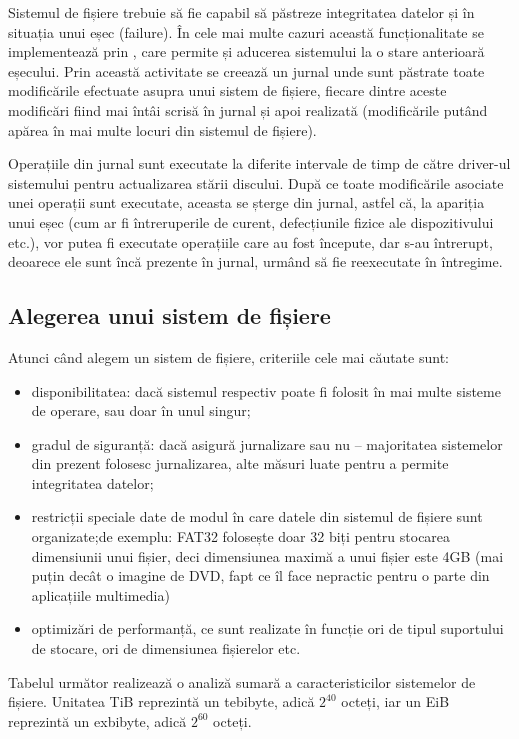 Sistemul de fișiere trebuie să fie capabil să păstreze integritatea datelor și
în situația unui eșec (failure). În cele mai multe cazuri această
funcționalitate se implementează prin , care permite și
aducerea sistemului la o stare anterioară eșecului. Prin această activitate se
creează un jurnal unde sunt păstrate toate modificările efectuate asupra unui
sistem de fișiere, fiecare dintre aceste modificări fiind mai întâi scrisă în
jurnal și apoi realizată (modificările putând apărea în mai multe locuri din
sistemul de fișiere).

Operațiile din jurnal sunt executate la diferite intervale de timp de către
driver-ul sistemului pentru actualizarea stării discului. După ce toate
modificările asociate unei operații sunt executate, aceasta se șterge din
jurnal, astfel că, la apariția unui eșec (cum ar fi întreruperile de curent,
defecțiunile fizice ale dispozitivului etc.), vor  putea fi executate operațiile
care au fost începute, dar s-au întrerupt, deoarece ele sunt încă prezente în
jurnal, urmând să fie reexecutate în întregime.

\subsection{Alegerea unui sistem de fișiere}

Atunci când alegem un sistem de fișiere, criteriile cele mai căutate sunt:

\begin{itemize}
	\item disponibilitatea: dacă sistemul respectiv poate fi folosit în mai
		multe sisteme de operare, sau doar în unul singur;
	\item gradul de siguranță: dacă asigură jurnalizare sau nu – majoritatea
		sistemelor din prezent folosesc jurnalizarea, alte măsuri luate
		pentru a permite integritatea datelor;
	\item restricții speciale date de modul în care datele din sistemul de
		fișiere sunt organizate;de exemplu: FAT32 folosește doar 32 biți
		pentru stocarea dimensiunii unui fișier, deci dimensiunea maximă
		a unui fișier este 4GB (mai puțin decât o imagine de DVD, fapt
		ce îl face nepractic pentru o parte din aplicațiile multimedia)
	\item optimizări de performanță, ce sunt realizate în funcție ori de
		tipul suportului de stocare, ori de dimensiunea fișierelor etc.
\end{itemize}

Tabelul următor realizează o analiză sumară a caracteristicilor sistemelor de
fișiere. Unitatea TiB reprezintă un tebibyte, adică $2^{40}$ octeți, iar un EiB
reprezintă un exbibyte, adică $2^{60}$ octeți.

